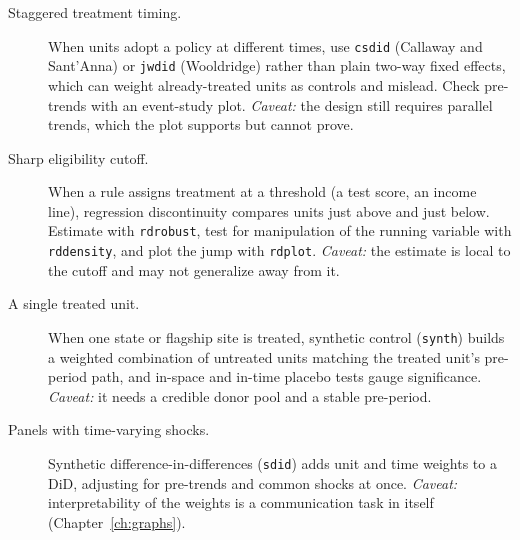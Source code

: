 \documentclass[
    a4paper,
    fontsize=10pt,
    twoside=true,
    numbers=noenddot,
]{kaobook}
\begin{document}
\begin{description}
    \item[Staggered treatment timing.] When units adopt a policy at different times, use \texttt{csdid} (Callaway and Sant'Anna) or \texttt{jwdid} (Wooldridge) rather than plain two-way fixed effects, which can weight already-treated units as controls and mislead. Check pre-trends with an event-study plot. \emph{Caveat:} the design still requires parallel trends, which the plot supports but cannot prove.
    \item[Sharp eligibility cutoff.] When a rule assigns treatment at a threshold (a test score, an income line), regression discontinuity compares units just above and just below. Estimate with \texttt{rdrobust}, test for manipulation of the running variable with \texttt{rddensity}, and plot the jump with \texttt{rdplot}. \emph{Caveat:} the estimate is local to the cutoff and may not generalize away from it.
    \item[A single treated unit.] When one state or flagship site is treated, synthetic control (\texttt{synth}) builds a weighted combination of untreated units matching the treated unit's pre-period path, and in-space and in-time placebo tests gauge significance. \emph{Caveat:} it needs a credible donor pool and a stable pre-period.
    \item[Panels with time-varying shocks.] Synthetic difference-in-differences (\texttt{sdid}) adds unit and time weights to a DiD, adjusting for pre-trends and common shocks at once. \emph{Caveat:} interpretability of the weights is a communication task in itself (Chapter~\ref{ch:graphs}).

\end{description}
\end{document}
